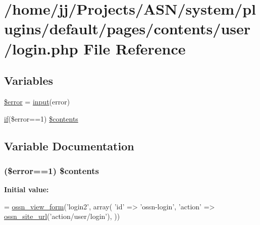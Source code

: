\hypertarget{system_2plugins_2default_2pages_2contents_2user_2login_8php}{}\section{/home/jj/\+Projects/\+A\+S\+N/system/plugins/default/pages/contents/user/login.php File Reference}
\label{system_2plugins_2default_2pages_2contents_2user_2login_8php}
\subsection*{Variables}
\begin{DoxyCompactItemize}
\item 
\hyperlink{system_2plugins_2default_2pages_2contents_2user_2login_8php_aeba2ab722cedda53dbb7ec1a59f45550}{\$error} = \hyperlink{ossn_8lib_8input_8php_a64ebee98b041c4f75f71ed3cd73cc8ed}{input}(\textquotesingle{}error\textquotesingle{})
\item 
\hyperlink{jquery_8tokeninput_8js_ad8dd46a3cbc004569e34401e9e71771a}{if}(\$error==1) \hyperlink{system_2plugins_2default_2pages_2contents_2user_2login_8php_abb0beeb512380a97a3c8c6f6cc91a859}{\$contents}
\end{DoxyCompactItemize}


\subsection{Variable Documentation}
\subsubsection[{\texorpdfstring{\$contents}{$contents}}]{ (\$error==1) \$contents}\hypertarget{system_2plugins_2default_2pages_2contents_2user_2login_8php_abb0beeb512380a97a3c8c6f6cc91a859}{}\label{system_2plugins_2default_2pages_2contents_2user_2login_8php_abb0beeb512380a97a3c8c6f6cc91a859}
{\bfseries Initial value\+:}
\begin{DoxyCode}
= \hyperlink{ossn_8lib_8views_8php_ac874e6342b6bbe7ac279180d7b4dcd2b}{ossn\_view\_form}(\textcolor{stringliteral}{'login2'}, array(
                    \textcolor{stringliteral}{'id'} => \textcolor{stringliteral}{'ossn-login'},
                    \textcolor{stringliteral}{'action'} => \hyperlink{ossn_8lib_8system_8php_a2f12f9244f99eccd1225afb76ef2ab65}{ossn\_site\_url}(\textcolor{stringliteral}{'action/user/login'}),
            ))
\end{DoxyCode}



